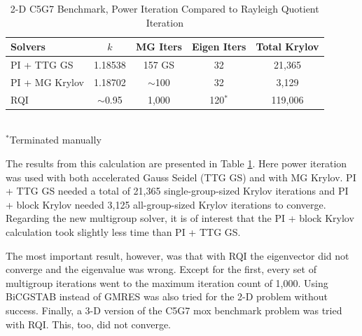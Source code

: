 \begin{table}[!h]
\caption{2-D C5G7 Benchmark, Power Iteration Compared to Rayleigh Quotient Iteration}
\begin{center}
\begin{tabular}{| l | c | c | c | c |}
\hline
Solvers & $k$ & MG Iters & Eigen Iters & Total Krylov \\[0.5ex]
\hline
PI + TTG GS & 1.18538 & 157 GS & 32 & 21,365 \\
PI +  MG Krylov & 1.18702 &  $\sim$100 & 32 & 3,129 \\
RQI & $\sim$0.95 & 1,000 & 120$^{*}$ & 119,006 \\
\hline
\end{tabular} \\
$^{*}$Terminated manually
\end{center}
\label{table:2DMoxRQI}
\end{table}
%
The results from this calculation are presented in Table \ref{table:2DMoxRQI}. Here power iteration was used with both accelerated Gauss Seidel (TTG GS) and with MG Krylov. PI + TTG GS needed a total of 21,365 single-group-sized Krylov iterations and PI + block Krylov needed 3,125 all-group-sized Krylov iterations to converge. Regarding the new multigroup solver, it is of interest that the PI + block Krylov calculation took slightly less time than PI + TTG GS. 

The most important result, however, was that with RQI the eigenvector did not converge and the eigenvalue was wrong. Except for the first, every set of multigroup iterations went to the maximum iteration count of 1,000. Using BiCGSTAB instead of GMRES was also tried for the 2-D problem without success. Finally, a 3-D version of the C5G7 mox benchmark problem \cite{OECD-NEA2005} was tried with RQI. This, too, did not converge.  

